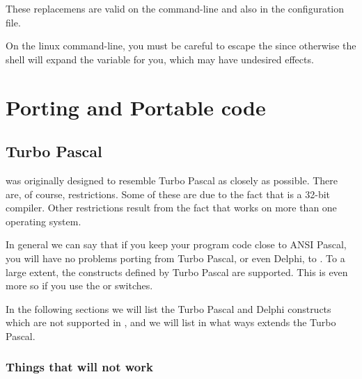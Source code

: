 These replacemens are valid on the command-line and also in the
configuration file.

On the linux command-line, you must be careful to escape the \var{\$} since
otherwise the shell will expand the variable for you, which may have
undesired effects.





\chapter{Porting and Portable code }


\section{Turbo Pascal}
\fpc was originally designed to resemble Turbo Pascal as closely as possible. 
There are, of course, restrictions. Some of these are due to the fact that \fpc is
a 32-bit compiler. Other restrictions result from the fact that \fpc works
on more than one operating system.

In general we can say that if you keep your program code close to ANSI
Pascal, you will have no problems porting from Turbo Pascal, or even Delphi, to
\fpc. To a large extent, the constructs defined by Turbo Pascal are
supported. This is even more so if you use the  or 
switches.

In the following sections we will list the Turbo Pascal and Delphi 
constructs which are not supported in \fpc, and we will list in what
ways \fpc extends the Turbo Pascal.

\subsection{Things that will not work}

